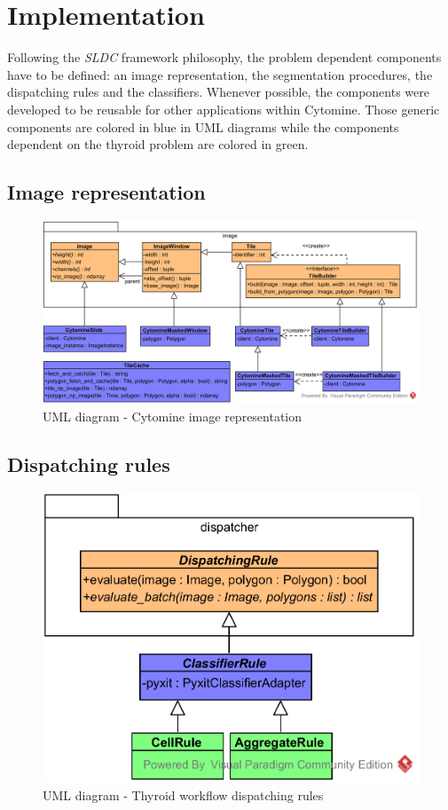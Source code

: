 \section{Implementation}
\label{sec:thyroid_implementation}
Following the \textit{SLDC} framework philosophy, the problem dependent components have to be defined: an image representation, the segmentation procedures, the dispatching rules and the classifiers. Whenever possible, the components were developed to be reusable for other applications within Cytomine. Those generic components are colored in blue in UML diagrams while the components dependent on the thyroid problem are colored in green.

\subsection{Image representation}

\begin{figure}
	\center
	\includegraphics[scale=0.85]{image/thyroid_image.png}
	\caption{UML diagram - Cytomine image representation}
	\label{fig:uml_cyto_im_repr}
\end{figure}

\subsection{Dispatching rules}

\begin{figure}
	\center
	\includegraphics[scale=0.85]{image/thyroid_dispatching_rules.png}
	\caption{UML diagram - Thyroid workflow dispatching rules}
	\label{fig:uml_cyto_disp_rules}
\end{figure}

